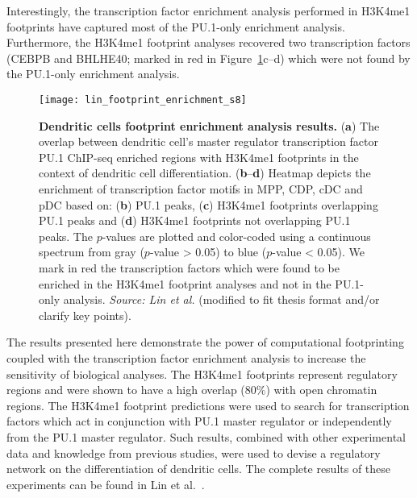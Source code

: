 Interestingly, the transcription factor enrichment analysis performed in H3K4me1 footprints have captured most of the PU.1-only enrichment analysis. Furthermore, the H3K4me1 footprint analyses recovered two transcription factors (CEBPB and BHLHE40; marked in red in Figure~\ref{fig:lin_footprint_enrichment_s8}c--d) which were not found by the PU.1-only enrichment analysis.

\begin{figure}[h!]
\centering
\texttt{[image: lin\_footprint\_enrichment\_s8]}
\caption[Dendritic cells footprint enrichment analysis results]{\textbf{Dendritic cells footprint enrichment analysis results.} (\textbf{a}) The overlap between dendritic cell's master regulator transcription factor PU.1 ChIP-seq enriched regions with H3K4me1 footprints in the context of dendritic cell differentiation. (\textbf{b}--\textbf{d}) Heatmap depicts the enrichment of transcription factor motifs in MPP, CDP, cDC and pDC based on: (\textbf{b}) PU.1 peaks, (\textbf{c}) H3K4me1 footprints overlapping PU.1 peaks and (\textbf{d}) H3K4me1 footprints not overlapping PU.1 peaks. The $p$-values are plotted and color-coded using a continuous spectrum from gray ($p$-value > 0.05) to blue ($p$-value < 0.05). We mark in red the transcription factors which were found to be enriched in the H3K4me1 footprint analyses and not in the PU.1-only analysis. \emph{Source: Lin et al.}\cite{lin2015} (modified to fit thesis format and/or clarify key points).}
\label{fig:lin_footprint_enrichment_s8}
\end{figure}

The results presented here demonstrate the power of computational footprinting coupled with the transcription factor enrichment analysis to increase the sensitivity of biological analyses. The H3K4me1 footprints represent regulatory regions and were shown to have a high overlap (\approxy$80\%$) with open chromatin regions. The H3K4me1 footprint predictions were used to search for transcription factors which act in conjunction with PU.1 master regulator or independently from the PU.1 master regulator. Such results, combined with other experimental data and knowledge from previous studies, were used to devise a regulatory network on the differentiation of dendritic cells. The complete results of these experiments can be found in Lin et al.~\cite{lin2015}.

